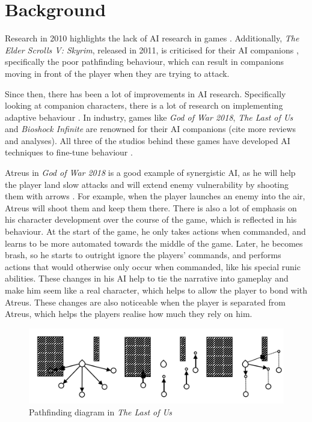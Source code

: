 \documentclass{IEEEtran}
\begin{document}
\section{Background}
\label{Background}

Research in 2010 highlights the lack of AI research in games \cite{RealTimeAICritique2010}. Additionally, \textit{The Elder Scrolls V: Skyrim}, released in 2011, is criticised for their AI companions \cite{tremblay2013adaptive}, specifically the poor pathfinding behaviour, which can result in companions moving in front of the player when they are trying to attack.


Since then, there has been a lot of improvements in AI research. Specifically looking at companion characters, there is a lot of research on implementing adaptive behaviour \cite{tremblay2013adaptive, CompanionBotsFPS2019, GeneratingCollabBehaviourPlanRecognition2016}. In industry, games like \textit{God of War 2018}, \textit{The Last of Us} and \textit{Bioshock Infinite} are renowned for their AI companions \cite{PlayDontShow} (cite more reviews and analyses). All three of the studios behind these games have developed AI techniques to fine-tune behaviour \cite{GDCAtreus, GAIP2EllieAI, GDCElizabeth, AIGamesBioshockAI}.

Atreus in \textit{God of War 2018} is a good example of synergistic AI, as he will help the player land slow attacks and will extend enemy vulnerability by shooting them with arrows \cite{GDCAtreus}. For example, when the player launches an enemy into the air, Atreus will shoot them and keep them there. There is also a lot of emphasis on his character development over the course of the game, which is reflected in his behaviour. At the start of the game, he only takes actions when commanded, and learns to be more automated towards the middle of the game. Later, he becomes brash, so he starts to outright ignore the players’ commands, and performs actions that would otherwise only occur when commanded, like his special runic abilities. These changes in his AI help to tie the narrative into gameplay and make him seem like a real character, which helps to allow the player to bond with Atreus. These changes are also noticeable when the player is separated from Atreus, which helps the players realise how much they rely on him.

\begin{figure}
  \centering
  \includegraphics[width=\linewidth]{Images/TLOUPathfinding.png}
  
\caption{Pathfinding diagram in \textit{The Last of Us}}
\label{fig:TLOUPathfinding}
\end{figure}
\end{document}
